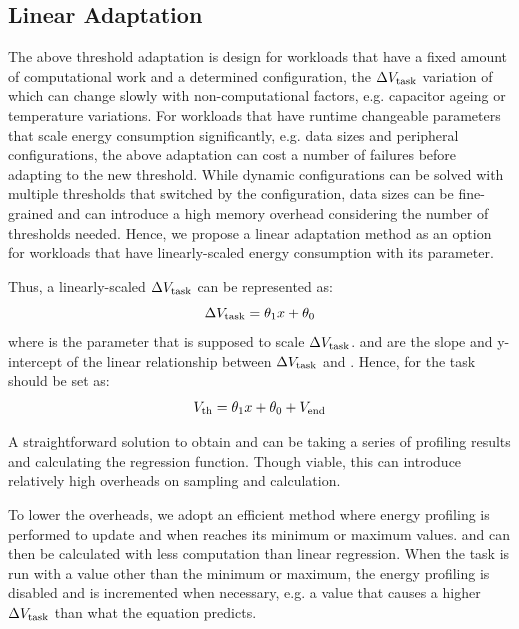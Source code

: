 \subsection{Linear Adaptation}

The above threshold adaptation is design for workloads that have a fixed amount of computational work and a determined configuration, the $\Delta V_{\text{task}}$ variation of which can change slowly with non-computational factors, e.g. capacitor ageing or temperature variations.
For workloads that have runtime changeable parameters that scale energy consumption significantly, e.g. data sizes and peripheral configurations, the above adaptation can cost a number of failures before adapting to the new threshold. 
While dynamic configurations can be solved with multiple thresholds that switched by the configuration, data sizes can be fine-grained and can introduce a high memory overhead considering the number of thresholds needed. 
Hence, we propose a linear adaptation method as an option for workloads that have linearly-scaled energy consumption with its parameter. 

Thus, a linearly-scaled $\Delta V_{\text{task}}$ can be represented as:
\begin{equation}
    \Delta V_{\text{task}} = \theta_{\text{1}} x + \theta_{\text{0}}
\end{equation}
where  is the parameter that is supposed to scale $\Delta V_{\text{task}}$.  and  are the slope and y-intercept of the linear relationship between $\Delta V_{\text{task}}$ and . Hence,  for the task should be set as:
\begin{equation}
    V_{\text{th}} = \theta_{\text{1}} x + \theta_{\text{0}} + V_{\text{end}}
\end{equation}

A straightforward solution to obtain  and  can be taking a series of profiling results and calculating the regression function.
Though viable, this can introduce relatively high overheads on sampling and calculation.

To lower the overheads, we adopt an efficient method where energy profiling is performed to update  and  when  reaches its minimum or maximum values. 
 and  can then be calculated with less computation than linear regression. 
When the task is run with a  value other than the minimum or maximum, the energy profiling is disabled and  is incremented when necessary, e.g. a  value that causes a higher $\Delta V_{\text{task}}$ than what the equation predicts. 

